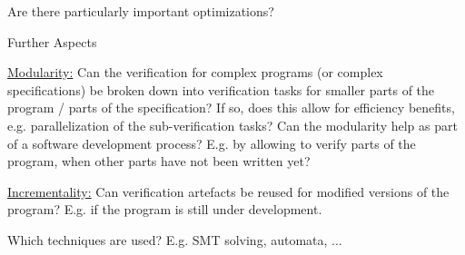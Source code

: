 \documentclass[a4paper]{article}
\begin{document}
\begin{minipage}[t]{0.16\linewidth}
\begin{betterlist}
\begin{betterlist}
			\item Are there particularly important optimizations?

		\end{betterlist}
		\item \alert{Further Aspects}
		\begin{betterlist}
			\item \underline{Modularity:} Can the verification for complex programs (or complex specifications) be broken down into verification tasks for smaller parts of the program / parts of the specification? If so, does this allow for efficiency benefits, e.g. parallelization of the sub-verification tasks? Can the modularity help as part of a software development process? E.g. by allowing to verify parts of the program, when other parts have not been written yet?

			\item \underline{Incrementality:} Can verification artefacts be reused for modified versions of the program? E.g. if the program is still under development.

			\item Which techniques are used? E.g. SMT solving, automata, ...


\end{betterlist}
\end{betterlist}
\end{minipage}
\end{document}
